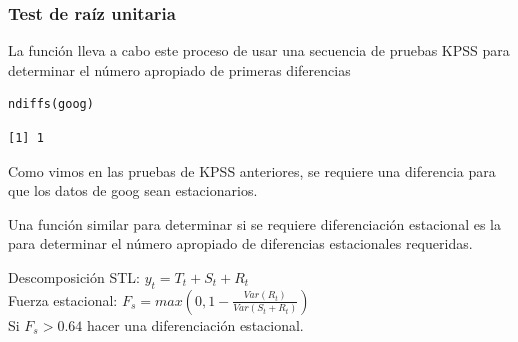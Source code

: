 \documentclass[10pt]{beamer}
\begin{document}
\begin{frame}[fragile]
\frametitle{Test de raíz unitaria}


La función lleva a cabo este proceso de usar una secuencia de pruebas KPSS para determinar el número apropiado de primeras diferencias

\lstset{language=r,label= ,caption= ,captionpos=b,numbers=none}
\begin{lstlisting}
ndiffs(goog)
\end{lstlisting}

\pause

{\scriptsize
\begin{verbatim}
[1] 1
\end{verbatim}
}

Como vimos en las pruebas de KPSS anteriores, se requiere una diferencia para que los datos de goog sean estacionarios.


\pause
{\small
\begin{block}{}
Una función similar para determinar si se requiere diferenciación estacional es la  para determinar el número apropiado de diferencias estacionales requeridas. 

\vspace{4mm}
Descomposición STL: $ y_t = T_t + S_t + R_t$\\
Fuerza estacional: $F_s = max(0, 1- \frac{Var(R_t)}{Var(S_t+R_t)})$\\
Si $F_s > 0.64$ hacer una diferenciación estacional.
\end{block}
}

\end{frame}


\end{document}
